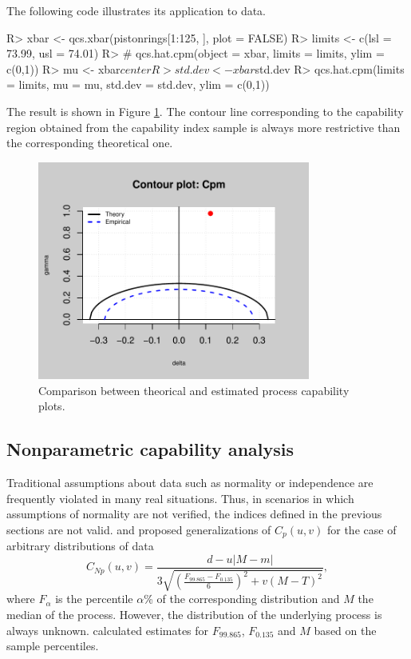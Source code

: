 The following code illustrates its application to  data. 
\begin{example}
R> xbar <- qcs.xbar(pistonrings[1:125, ], plot = FALSE)
R> limits <- c(lsl = 73.99, usl = 74.01)
R> # qcs.hat.cpm(object = xbar, limits = limits, ylim = c(0,1))
R> mu <- xbar$center
R> std.dev <- xbar$std.dev
R> qcs.hat.cpm(limits = limits, mu = mu, std.dev = std.dev, ylim = c(0,1))
\end{example}
The result is shown in Figure \ref{fig:cpplot2}. 
The contour line corresponding to the capability region obtained from the capability index sample is always more restrictive than the corresponding theoretical one.
\begin{figure}[!htb]
\begin{center}
\includegraphics[width=0.8\textwidth]{article-cpplot2-plot}
\caption{Comparison between theorical and estimated process capability plots.}
\label{fig:cpplot2}
\end{center}
\end{figure}

\subsection{Nonparametric capability analysis}

Traditional assumptions about data such as normality or independence are frequently violated in many real situations. 
Thus, in scenarios in which assumptions of normality are not verified, the indices defined in the previous sections are not valid. 
\citet{pearn1997practical} and \citet{tong1998lower} proposed generalizations of $C_p\left(u, v\right)$ for the case of arbitrary distributions of data
$$ C_{Np}\left( u,v\right)= \frac{d-u\vert M - m\vert}{3\sqrt{\left(\frac{F_{99.865}-F_{0.135}}{6} \right)^2+v\left( M - T\right)^2}},$$
where $F_{\alpha}$ is the percentile $\alpha$\% of the corresponding distribution and $M$ the median of the process. 
However, the distribution of the underlying process is always unknown. 
\cite{chang1994pci} calculated estimates for $F_{99.865}$, $F_{0.135}$ and $M$ based on the sample percentiles.

